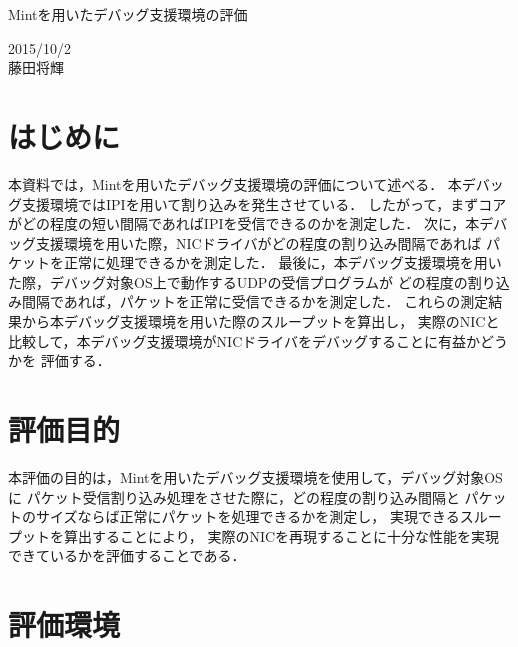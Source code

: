 \documentclass[12pt]{jsarticle}
\begin{document}

\begin{center}
    {\LARGE Mintを用いたデバッグ支援環境の評価}
\end{center}

\begin{flushright}
    2015/10/2\\
    藤田将輝
\end{flushright}

\section{はじめに}

本資料では，Mintを用いたデバッグ支援環境の評価について述べる．
本デバッグ支援環境ではIPIを用いて割り込みを発生させている．
したがって，まずコアがどの程度の短い間隔であればIPIを受信できるのかを測定した．
次に，本デバッグ支援環境を用いた際，NICドライバがどの程度の割り込み間隔であれば
パケットを正常に処理できるかを測定した．
最後に，本デバッグ支援環境を用いた際，デバッグ対象OS上で動作するUDPの受信プログラムが
どの程度の割り込み間隔であれば，パケットを正常に受信できるかを測定した．
これらの測定結果から本デバッグ支援環境を用いた際のスループットを算出し，
実際のNICと比較して，本デバッグ支援環境がNICドライバをデバッグすることに有益かどうかを
評価する．

\section{評価目的}

本評価の目的は，Mintを用いたデバッグ支援環境を使用して，デバッグ対象OSに
パケット受信割り込み処理をさせた際に，どの程度の割り込み間隔と
パケットのサイズならば正常にパケットを処理できるかを測定し，
実現できるスループットを算出することにより，
実際のNICを再現することに十分な性能を実現できているかを評価することである．

\section{評価環境}
\end{document}
